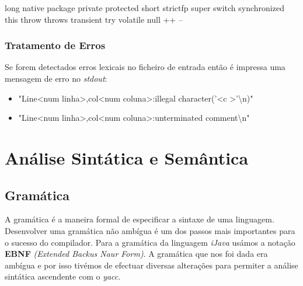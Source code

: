 \documentclass[12pt]{article}
\begin{document}
\begin{itemize}
\begin{itemize}
	       	                 \text{\textbar} long
	       	                 \text{\textbar} native
	       	                 \text{\textbar} package
	       	                 \text{\textbar} private 
	       	                 \text{\textbar} protected 
	       	                 \text{\textbar} short 
	       	                 \text{\textbar} strictfp
	       	                 \text{\textbar} super 
	       	                 \text{\textbar} switch 
	       	                 \text{\textbar} synchronized 
	       	                 \text{\textbar} this 
	       	                 \text{\textbar} throw 
	       	                 \text{\textbar} throws 
	       	                 \text{\textbar} transient 
	       	                 \text{\textbar} try
	       	                 \text{\textbar} volatile
		       	             \text{\textbar} null
	       	                 \text{\textbar} ++
	       	                 \text{\textbar} --
	       	            \end{itemize}      	        
		\end{itemize}
		
		
		\subsubsection{Tratamento de Erros}
		Se forem detectados erros lexicais no ficheiro de entrada então é impressa uma mensagem de erro no \emph{stdout}:
		\begin{itemize}
            \item "Line\textless num linha\textgreater,col\textless num coluna\textgreater:illegal character('\textless c \textgreater'\textbackslash n)"
            \item "Line\textless num linha\textgreater,col\textless num coluna\textgreater:unterminated comment\textbackslash n"
        \end{itemize}
		






\section{Análise Sintática e Semântica}

\subsection{Gramática}

A gramática é a maneira formal de especificar a sintaxe de uma linguagem. 
Desenvolver uma gramática não ambígua é um dos passos mais importantes para o sucesso do compilador. Para a gramática da linguagem \emph{iJava} usámos a notação \textbf{EBNF} \emph{(Extended Backus Naur Form)}. 
A gramática que nos foi dada era ambígua e por isso tivémos de efectuar diversas alterações para permiter a análise sintática ascendente com o \emph{yacc}.\\
\end{document}

